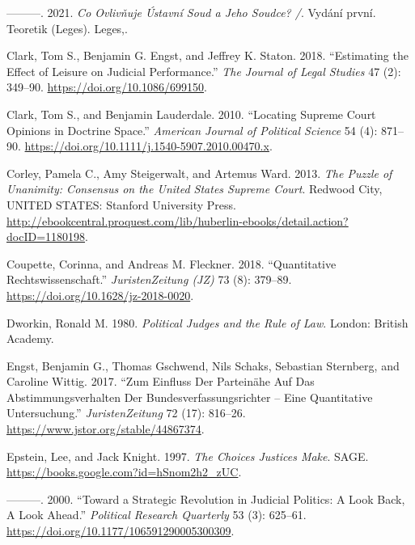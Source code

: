 \documentclass[
  11pt,
]{article}
\newlength{\cslhangindent}
\newenvironment{CSLReferences}[2] %
 {%
  \setlength{\parindent}{0pt}
  \ifodd #1 \everypar{\setlength{\hangindent}{\cslhangindent}}\ignorespaces\fi
  \ifnum #2 > 0
  \setlength{\parskip}{#2\baselineskip}
  \fi
 }%
 {}
\begin{document}
\begin{CSLReferences}{1}{0}
\leavevmode{}%
---------. 2021. \emph{Co Ovlivňuje {Ústavní} Soud a Jeho Soudce? /}.
Vydání první. Teoretik ({Leges}). {Leges,}.

\leavevmode{}%
Clark, Tom S., Benjamin G. Engst, and Jeffrey K. Staton. 2018.
{``Estimating the {Effect} of {Leisure} on {Judicial Performance}.''}
\emph{The Journal of Legal Studies} 47 (2): 349--90.
\url{https://doi.org/10.1086/699150}.

\leavevmode{}%
Clark, Tom S., and Benjamin Lauderdale. 2010. {``Locating {Supreme Court
Opinions} in {Doctrine Space}.''} \emph{American Journal of Political
Science} 54 (4): 871--90.
\url{https://doi.org/10.1111/j.1540-5907.2010.00470.x}.

\leavevmode{}%
Corley, Pamela C., Amy Steigerwalt, and Artemus Ward. 2013. \emph{The
{Puzzle} of {Unanimity}: {Consensus} on the {United States Supreme
Court}}. {Redwood City, UNITED STATES}: {Stanford University Press}.
\url{http://ebookcentral.proquest.com/lib/huberlin-ebooks/detail.action?docID=1180198}.

\leavevmode{}%
Coupette, Corinna, and Andreas M. Fleckner. 2018. {``Quantitative
{Rechtswissenschaft}.''} \emph{JuristenZeitung (JZ)} 73 (8): 379--89.
\url{https://doi.org/10.1628/jz-2018-0020}.

\leavevmode{}%
Dworkin, Ronald M. 1980. \emph{Political Judges and the Rule of Law}.
{London}: {British Academy}.

\leavevmode{}%
Engst, Benjamin G., Thomas Gschwend, Nils Schaks, Sebastian Sternberg,
and Caroline Wittig. 2017. {``Zum {Einfluss} Der {Parteinähe} Auf Das
{Abstimmungsverhalten} Der {Bundesverfassungsrichter} -- Eine
Quantitative {Untersuchung}.''} \emph{JuristenZeitung} 72 (17): 816--26.
\url{https://www.jstor.org/stable/44867374}.

\leavevmode{}%
Epstein, Lee, and Jack Knight. 1997. \emph{The {Choices Justices Make}}.
{SAGE}. \url{https://books.google.com?id=hSnom2h2_zUC}.

\leavevmode{}%
---------. 2000. {``Toward a {Strategic Revolution} in {Judicial
Politics}: {A Look Back}, {A Look Ahead}.''} \emph{Political Research
Quarterly} 53 (3): 625--61.
\url{https://doi.org/10.1177/106591290005300309}.


\end{CSLReferences}
\end{document}
